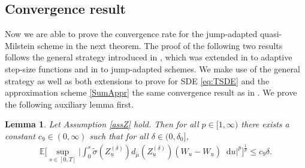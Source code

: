\documentclass[11pt,a4paper]{article}
\numberwithin{equation}{section}
\newtheorem{lemma}[theorem]{Lemma}
\theoremstyle{definition}
\newcommand{\E}{{\mathbb{E}}}
\newcommand{\diff}{\mathop{}\!\mathrm{d}}
\begin{document}
\subsection{Convergence result}

Now we are able to prove the convergence rate for the jump-adapted quasi-Milstein scheme in the next theorem. The proof of the following two results follows the general strategy introduced in \cite[Proof of Theorem 3]{muellergronbach2019b}, which was extended in \cite[Section 5.4]{Yaroslavtseva2022} to adaptive step-size functions and in \cite[Proof of Theorem 3.14]{PSS2024JMS} to jump-adapted schemes. We make use of the general strategy as well as both extensions to prove for SDE \eqref{eq:TSDE} and the approximation scheme \eqref{SumAppr} the same convergence result as in \cite{Yaroslavtseva2022}. 
We prove the following auxiliary lemma first.

\begin{lemma}\label{AuxLemma}
    Let Assumption \ref{assZ} hold. Then for all $p\in[1,\infty)$ there exists a constant $c_{9}\in(0,\infty)$ such that for all $\delta\in (0,\delta_0]$,
    \begin{equation}
        \begin{aligned}
        \E\Big[\sup_{s\in[0,T]}\Big|\int_0^s  \widetilde\sigma(Z^{(\delta)}_{\underline u}) d_{\widetilde\mu}(Z^{(\delta)}_{\underline u}) (W_u-W_{\underline u})  \diff u\Big|^p \Big]^{\frac{1}{p}} \leq c_{9} \delta.
        \end{aligned}
    \end{equation}
\end{lemma}
\end{document}
